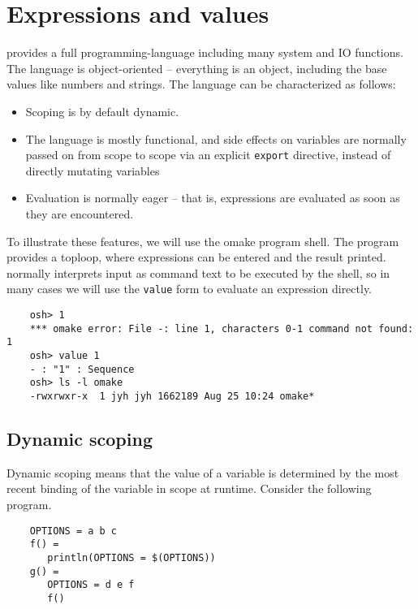 %
%
\chapter{Expressions and values}
\label{chapter:extra}

 provides a full programming-language including many
system and IO functions.  The language is object-oriented -- everything is
an object, including the base values like numbers and strings.  The 
language can be characterized as follows:

\begin{itemize}
\item Scoping is by default dynamic.
\item The language is mostly functional, and side effects on variables are
  normally passed on
  from scope to scope via an explicit \verb+export+ directive, instead of
  directly mutating variables
\item Evaluation is normally eager -- that is, expressions are evaluated as soon
  as they are encountered.
\end{itemize}

To illustrate these features, we will use the  omake program shell.
The  program provides a toploop, where expressions can be entered
and the result printed.   normally interprets input as command text
to be executed by the shell, so in many cases we will use the \verb+value+
form to evaluate an expression directly.

\begin{verbatim}
    osh> 1
    *** omake error: File -: line 1, characters 0-1 command not found: 1
    osh> value 1
    - : "1" : Sequence
    osh> ls -l omake
    -rwxrwxr-x  1 jyh jyh 1662189 Aug 25 10:24 omake*
\end{verbatim}

\section{Dynamic scoping}

Dynamic scoping means that the value of a variable is determined by the most
recent binding of the variable in scope at runtime.  Consider the following
program.

\begin{verbatim}
    OPTIONS = a b c
    f() =
       println(OPTIONS = $(OPTIONS))
    g() =
       OPTIONS = d e f
       f()
\end{verbatim}

